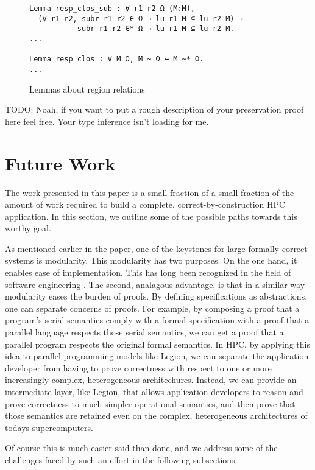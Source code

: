 \documentclass[sigconf]{acmart}
\begin{document}
\begin{figure}
\centering
\begin{BVerbatim}
Lemma resp_clos_sub : ∀ r1 r2 Ω (M:M), 
  (∀ r1 r2, subr r1 r2 ∈ Ω → lu r1 M ⊆ lu r2 M) → 
           subr r1 r2 ∈* Ω → lu r1 M ⊆ lu r2 M.
...

Lemma resp_clos : ∀ M Ω, M ~ Ω ↔ M ~* Ω.
...
\end{BVerbatim}
\caption{Lemmas about region relations}
\label{regionrelproof}
\end{figure}

TODO: Noah, if you want to put a rough description of your preservation proof 
here feel free. Your type inference isn't loading for me.

\section{Future Work}

The work presented in this paper is a small fraction of a small fraction of the
amount of work required to build a complete, correct-by-construction HPC
application. In this section, we outline some of the possible paths towards
this worthy goal. 

As mentioned earlier in the paper, one of the keystones for large formally
correct systems is modularity. This modularity has two purposes. On the one
hand, it enables ease of implementation. This has long been recognized 
in the field of software engineering \cite{?}. The second, analagous advantage,
is that in a similar way modularity eases the burden of proofs. By defining 
specifications as abstractions, one can separate concerns of proofs. For example,
by composing a proof that a program's serial semantics comply with a formal
specification with a proof that a parallel language respects those serial 
semantics, we can get a proof that a parallel program respects the original
formal semantics. In HPC, by applying this idea to parallel programming models like
Legion, we can separate the application developer from having to prove 
correctness with respect to one or more increasingly complex, heterogeneous
architechures. Instead, we can provide an intermediate layer, like Legion, that
allows application developers to reason and prove correctness to much 
simpler operational semantics, and then prove that those semantics are retained
even on the complex, heterogeneous architectures of todays supercomputers.

Of course this is much easier said than done, and we address some of the challenges
faced by such an effort in the following subsections.
\end{document}
